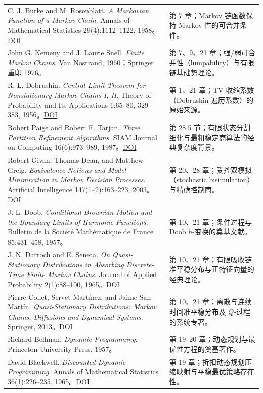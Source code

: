 \documentclass[
  11pt,
  oneside]{book}
\begin{document}
{\begin{longtable}[]{@{}
  >{\raggedright\arraybackslash}p{}
  >{\raggedright\arraybackslash}p{}@{}}
C. J. Burke and M. Rosenblatt. \emph{A Markovian Function of a Markov Chain}. Annals of Mathematical Statistics 29(4):1112--1122, 1958。\href{https://doi.org/10.1214/aoms/1177706444}{DOI} & 第 7 章；Markov 链函数保持 Markov 性的可合并条件。 \\
John G. Kemeny and J. Laurie Snell. \emph{Finite Markov Chains}. Van Nostrand, 1960；Springer 重印 1976。 & 第 7、9、21 章；强/弱可合并性（lumpability）与有限链基础势理论。 \\
R. L. Dobrushin. \emph{Central Limit Theorem for Nonstationary Markov Chains I, II}. Theory of Probability and Its Applications 1:65--80, 329--383, 1956。\href{https://doi.org/10.1137/1101006}{DOI} & 第 1、21 章；TV 收缩系数（Dobrushin 遍历系数）的原始来源。 \\
Robert Paige and Robert E. Tarjan. \emph{Three Partition Refinement Algorithms}. SIAM Journal on Computing 16(6):973--989, 1987。\href{https://doi.org/10.1137/0216062}{DOI} & 第 28.5 节；有限状态分割细化与最粗稳定商算法的经典复杂度背景。 \\
Robert Givan, Thomas Dean, and Matthew Greig. \emph{Equivalence Notions and Model Minimization in Markov Decision Processes}. Artificial Intelligence 147(1--2):163--223, 2003。\href{https://doi.org/10.1016/S0004-3702(02)00376-4}{DOI} & 第 20、28 章；受控双模拟（stochastic bisimulation）与精确控制商。 \\
J. L. Doob. \emph{Conditional Brownian Motion and the Boundary Limits of Harmonic Functions}. Bulletin de la Société Mathématique de France 85:431--458, 1957。 & 第 10、21 章；条件过程与 Doob \(h\)-变换的奠基文献。 \\
J. N. Darroch and E. Seneta. \emph{On Quasi-Stationary Distributions in Absorbing Discrete-Time Finite Markov Chains}. Journal of Applied Probability 2(1):88--100, 1965。\href{https://doi.org/10.2307/3211876}{DOI} & 第 10、21 章；有限吸收链准平稳分布与正特征向量的经典理论。 \\
Pierre Collet, Servet Martínez, and Jaime San Martín. \emph{Quasi-Stationary Distributions: Markov Chains, Diffusions and Dynamical Systems}. Springer, 2013。\href{https://doi.org/10.1007/978-3-642-33131-2}{DOI} & 第 10、21 章；离散与连续时间准平稳分布及 \(Q\)-过程的系统专著。 \\
Richard Bellman. \emph{Dynamic Programming}. Princeton University Press, 1957。 & 第 19--20 章；动态规划与最优性方程的奠基著作。 \\
David Blackwell. \emph{Discounted Dynamic Programming}. Annals of Mathematical Statistics 36(1):226--235, 1965。\href{https://doi.org/10.1214/aoms/1177700285}{DOI} & 第 19 章；折扣动态规划压缩映射与平稳最优策略存在性。 \\

\end{longtable}}
\end{document}

